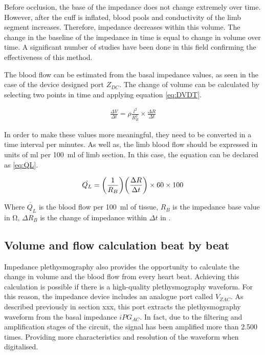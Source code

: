 Before occlusion, the base of the impedance does not change extremely over time. However, after the cuff is inflated, blood pools and conductivity of the limb segment increases. Therefore, impedance decreases within this volume. The change in the baseline of the impedance in time is equal to change in volume over time. A significant number of studies have been done in this field confirming the effectiveness of this method. 


The blood flow can be estimated from the basal impedance values, as seen in the case of the device designed port $Z_{DC}$. The change of volume can be calculated by selecting two points in time and applying equation \ref{eq:DVDT}.


\begin{align}
	\label{eq:DVDT}
	\frac{\Delta V}{\Delta t}= \rho \frac{l^2}{R_B^2} \times \frac{\Delta R}{\Delta t}
\end{align} 

In order to make these values more meaningful, they need to be converted in a time interval per minutes. As well as, the limb blood flow should be expressed in units of \si{\milli\litre} per \SI{100}{\milli\litre} of limb section. In this case, the equation can be declared as \ref{eq:QL}.

\begin{align}
	\label{eq:QL}
	\dot{Q_L} = \bigg( \frac{1}{R_B} \bigg) \bigg( \frac{\Delta R}{\Delta t} \bigg) \times 60  \times 100  \tagaddtext{[\si{ml/min.100.ml}]}
\end{align} 

Where $\dot{Q_L}$ is the blood flow per \SI{100}{\milli\litre} of tissue, $R_B$ is the impedance base value in \si{\ohm}, $\Delta R_B$ is the change of impedance within ${\Delta t}$ in \si{\sec}.

\subsection{Volume and flow calculation beat by beat}
\label{section procedure 3.2}
Impedance plethysmography also provides the opportunity to calculate the change in volume and the blood flow from every heart beat. Achieving this calculation is possible if there is a high-quality plethysmography waveform. For this reason, the impedance device includes an analogue port called $V_{ZAC}$. As described previously in section xxx, this port extracts the plethysmography waveform from the basal impedance $iPG_{AC}$. In fact, due to the filtering and amplification stages of the circuit, the signal has been amplified more than 2.500 times. Providing more characteristics and resolution of the waveform when digitalised.


